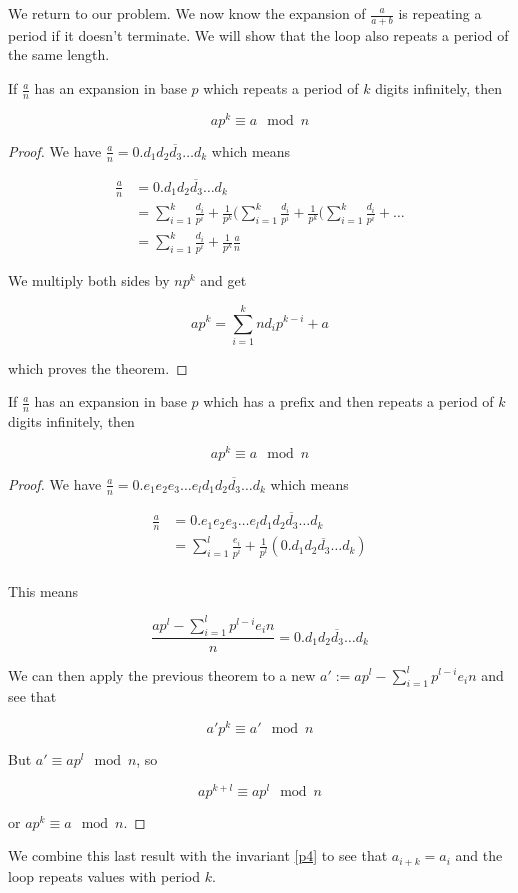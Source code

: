 We return to our problem. We now know the expansion of $\frac{a}{a+b}$ is repeating a period if it doesn't terminate. We will show that the loop also repeats a period of the same length.

\begin{thm}\label{while_a_decimal_expansion_six}
If $\frac{a}{n}$ has an expansion in base $p$ which repeats a period of $k$ digits infinitely, then

$$
a p^k \equiv a \mod n
$$  
\end{thm}

\begin{proof}
We have $\frac{a}{n} = 0.\overline{d_1 d_2 d_3 \ldots d_k}$ which means

\begin{align*}
\frac{a}{n} &= 0.\overline{d_1 d_2 d_3 \ldots d_k} \\
            &= \sum_{i = 1}^k \frac{d_i}{p^i} + \frac{1}{p^k} (\sum_{i = 1}^k \frac{d_i}{p^i} + \frac{1}{p^k} (\sum_{i = 1}^k \frac{d_i}{p^i} + \ldots \\
            &= \sum_{i = 1}^k \frac{d_i}{p^i} + \frac{1}{p^k} \frac{a}{n}
\end{align*}

We multiply both sides by $n p^k$ and get

$$
a p^k = \sum_{i = 1}^k n d_i p^{k - i} + a
$$

which proves the theorem.
\end{proof}

\begin{thm}\label{while_a_decimal_expansion_seven}
If $\frac{a}{n}$ has an expansion in base $p$ which has a prefix and then repeats a period of $k$ digits infinitely, then

$$
a p^k \equiv a \mod n
$$  
\end{thm}

\begin{proof}
We have $\frac{a}{n} = 0.e_1 e_2 e_3 \ldots e_l \overline{d_1 d_2 d_3 \ldots d_k}$ which means

\begin{align*}
\frac{a}{n} &= 0.e_1 e_2 e_3  \ldots e_l \overline{d_1 d_2 d_3 \ldots d_k} \\
            &= \sum_{i = 1}^l \frac{e_i}{p^i} + \frac{1}{p^l} (0.\overline{d_1 d_2 d_3 \ldots d_k}) \\
\end{align*}

This means

$$
\frac{a p^l - \sum_{i = 1}^l p^{l-i} e_i n}{n} = 0.\overline{d_1 d_2 d_3 \ldots d_k}
$$

We can then apply the previous theorem to a new $a' := a p^l - \sum_{i = 1}^l p^{l-i} e_i n$ and see that

$$
a' p^k \equiv a' \mod n
$$

But $a' \equiv a p^l \mod n$, so 

$$
a p^{k+l} \equiv a p^l \mod n
$$

or $a p^k \equiv a \mod n$. 
\end{proof}

We combine this last result with the invariant \ref{p4} to see that $a_{i + k} = a_i$ and the loop repeats values with period $k$.
